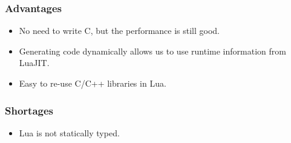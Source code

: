 \documentclass{beamer}
\begin{document}
\begin{frame}
	\frametitle{Advantages}
  \begin{itemize}
  \item No need to write C, but the performance is still good.\pause
  \item Generating code dynamically allows us to use runtime information from LuaJIT.\pause
  \item Easy to re-use C/C++ libraries in Lua.\pause
  \end{itemize}
\end{frame}

\begin{frame}
	\frametitle{Shortages}
  \begin{itemize}
  \item Lua is not statically typed.
  \end{itemize}
\end{frame}
\end{document}
